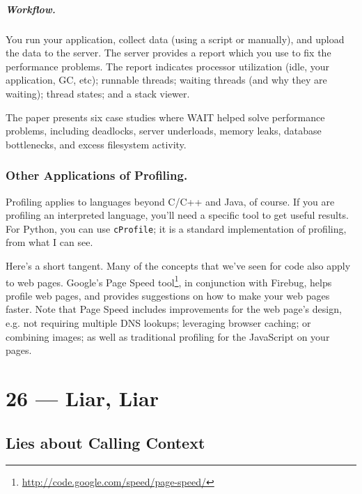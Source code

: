 \documentclass[a4paper]{report}
\begin{document}
\paragraph{Workflow.} You run your application, collect data (using a
script or manually), and upload the data to the server. The server provides
a report which you use to fix the performance problems.
The report indicates processor utilization (idle, your application, GC, 
etc); runnable threads; waiting threads (and why they are waiting); 
thread states; and a stack viewer.

The paper presents six case studies where WAIT helped solve performance
problems, including deadlocks, server underloads, memory leaks, database
bottlenecks, and excess filesystem activity.

\subsection*{Other Applications of Profiling.} 
Profiling applies to languages beyond C/C++ and Java, of course. If you are
profiling an interpreted language, you'll need a specific tool to get useful
results. For Python, you can use {\tt cProfile}; it is a standard implementation
of profiling, from what I can see.


Here's a short tangent. Many of the concepts that we've seen for code
also apply to web pages. Google's Page Speed
tool\footnote{\url{http://code.google.com/speed/page-speed/}}, in
conjunction with Firebug, helps profile web pages, and provides
suggestions on how to make your web pages faster. Note that Page Speed
includes improvements for the web page's design, e.g. not requiring
multiple DNS lookups; leveraging browser caching; or combining images;
as well as traditional profiling for the JavaScript on your pages.










\chapter*{26 --- Liar, Liar}


\section*{Lies about Calling Context}
\end{document}
